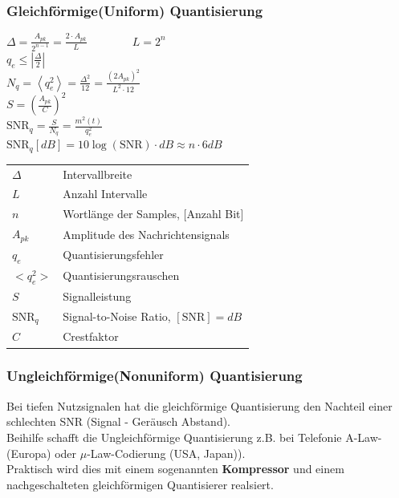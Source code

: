 \subsubsection{Gleichförmige(Uniform) Quantisierung}
\begin{multicols}{2}
	$ \Delta = \frac{A_{pk}}{2^{n-1}} = \frac{2 \cdot A_{pk}}{L} \qquad \qquad L =
	2^n$\\
	$q_e \leq |\frac{\Delta}{2}|$\\
	$ N_q = \left< q_e^2 \right> = \frac{\Delta^2}{12} =
	\frac{\left(2A_{pk}\right)^2}{L^2 \cdot 12}$ \\
	$ S = \left( \frac{ A_{pk} }{C} \right)^2$ \\
	$ \text{SNR}_{q} =\frac{S}{N_q}=\frac{m^2(t)}{q_e^2}$\\
	$\text{SNR}_{q} \left[dB\right] =10 \log(\text{SNR}) \cdot dB \approx n \cdot
	6dB$ \\
\columnbreak

	\begin{tabular}{l l}
		$\Delta$ & Intervallbreite \\
		$L$ & Anzahl Intervalle \\
		$n$ & Wortlänge der Samples, [Anzahl Bit] \\
		$A_{pk}$ & Amplitude des Nachrichtensignals \\
		$q_e$ & Quantisierungsfehler \\
		$<q_e^2>$ & Quantisierungsrauschen \\
		$S$ & Signalleistung\\
		$\text{SNR}_{q}$ & Signal-to-Noise Ratio, $[\text{SNR}] = dB$ \\
		$C$ & Crestfaktor \\
	\end{tabular}
\end{multicols}


\subsubsection{Ungleichförmige(Nonuniform) Quantisierung }
Bei tiefen Nutzsignalen hat die gleichförmige Quantisierung den Nachteil einer schlechten SNR
(Signal - Geräusch Abstand). \\
Beihilfe schafft die Ungleichförmige Quantisierung z.B. bei Telefonie
A-Law-(Europa) oder $\mu$-Law-Codierung (USA, Japan)). \\
Praktisch wird dies mit einem sogenannten \textbf{Kompressor} und einem nachgeschalteten
gleichförmigen Quantisierer realsiert.

